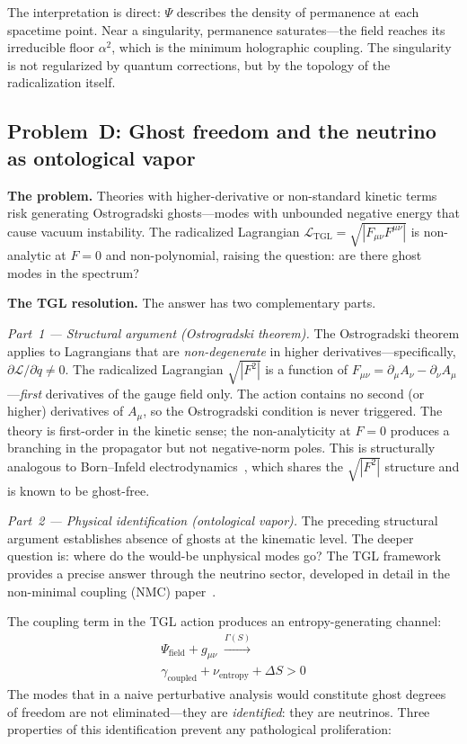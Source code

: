 \documentclass[12pt,a4paper,twocolumn]{article}
\newcommand{\alphaii}{\alpha^{2}}
\begin{document}
The interpretation is direct: $\Psi$ describes the density of permanence at 
each spacetime point. Near a singularity, permanence saturates---the field 
reaches its irreducible floor $\alphaii$, which is the minimum holographic 
coupling. The singularity is not regularized by quantum corrections, but by 
the topology of the radicalization itself.

\subsection{Problem~D: Ghost freedom and the neutrino as ontological vapor}
\label{sec:problem_d}

\textbf{The problem.} Theories with higher-derivative or non-standard kinetic 
terms risk generating Ostrogradski ghosts---modes with unbounded negative 
energy that cause vacuum instability. The radicalized Lagrangian 
$\mathcal{L}_{\text{TGL}} = \sqrt{|F_{\mu\nu}F^{\mu\nu}|}$ is non-analytic 
at $F=0$ and non-polynomial, raising the question: are there ghost modes in 
the spectrum?

\textbf{The TGL resolution.} The answer has two complementary parts.

\textit{Part~1 --- Structural argument (Ostrogradski theorem).} The 
Ostrogradski theorem applies to Lagrangians that are \emph{non-degenerate} in 
higher derivatives---specifically, $\partial \mathcal{L}/\partial\ddot{q} 
\neq 0$. The radicalized Lagrangian $\sqrt{|F^2|}$ is a function of 
$F_{\mu\nu} = \partial_\mu A_\nu - \partial_\nu A_\mu$---\emph{first} 
derivatives of the gauge field only. The action contains no second 
(or higher) derivatives of $A_\mu$, so the Ostrogradski condition is 
never triggered. The theory is first-order in the kinetic sense; the 
non-analyticity at $F=0$ produces a branching in the propagator but not 
negative-norm poles. This is structurally analogous to Born--Infeld 
electrodynamics~\cite{BornInfeld1934}, which shares the $\sqrt{|F^2|}$ 
structure and is known to be ghost-free.

\textit{Part~2 --- Physical identification (ontological vapor).} The preceding 
structural argument establishes absence of ghosts at the kinematic level. The 
deeper question is: where do the would-be unphysical modes go? The TGL 
framework provides a precise answer through the neutrino sector, developed 
in detail in the non-minimal coupling (NMC) 
paper~\cite{Miguel2025NMC}.

The coupling term in the TGL action produces an entropy-generating channel:
\begin{multline}
\Psi_{\text{field}} + g_{\mu\nu} \;\xrightarrow{\Gamma(S)}\; \\
\gamma_{\text{coupled}} + \nu_{\text{entropy}} + \Delta S > 0
\label{eq:vapor}
\end{multline}
The modes that in a naive perturbative analysis would constitute ghost 
degrees of freedom are not eliminated---they are \emph{identified}: they are 
neutrinos. Three properties of this identification prevent any pathological 
proliferation:
\end{document}
